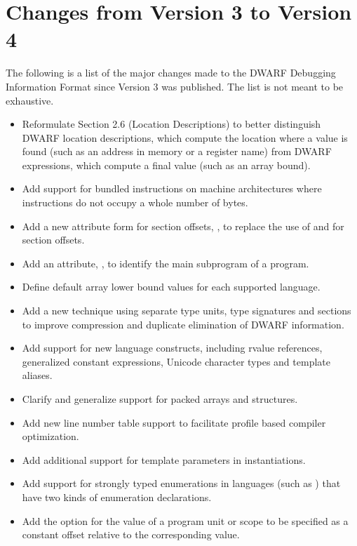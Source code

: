 \section{Changes from Version 3 to Version 4}
The following is a list of the major changes made to the 
DWARF Debugging Information Format since Version 3 was 
published. The list is not meant to be exhaustive.
\begin{itemize}
\item Reformulate 
Section 2.6 (Location Descriptions) 
to better distinguish DWARF location descriptions, which
compute the location where a value is found (such as an 
address in memory or a register name) from DWARF expressions, 
which compute a final value (such as an array bound).
\item Add support for bundled instructions on machine architectures 
where instructions do not occupy a whole number of bytes.
\item Add a new attribute form for section offsets, 
\DWFORMsecoffsetNAME,
to replace the use of 
\DWFORMdatafourNAME{} and \DWFORMdataeightNAME{} for section offsets.
\item Add an attribute, \DWATmainsubprogramNAME, to identify the main subprogram of a
program.
\item Define default array lower bound values for each supported language.
\item Add a new technique using separate type units, type signatures and \COMDAT{} sections to
improve compression and duplicate elimination of DWARF information.
\item Add support for new  language constructs, including rvalue references, generalized
constant expressions, Unicode character types and template aliases.
\item Clarify and generalize support for packed arrays and structures.
\item Add new line number table support to facilitate profile based compiler optimization.
\item Add additional support for template parameters in instantiations.
\item Add support for strongly typed enumerations in languages (such as ) that have two
kinds of enumeration declarations.
\item 
Add the option for the \DWAThighpc{} value of a program unit or scope to be 
specified as a constant offset relative to the corresponding \DWATlowpc{} value.
\end{itemize}
